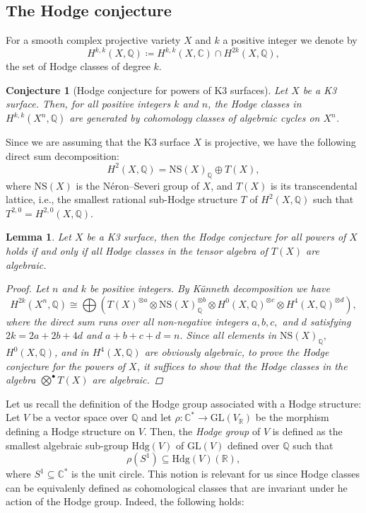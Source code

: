 \documentclass[11pt,twoside,a4paper]{amsart}
\newcommand{\0}{\mathscr{O}}
\newcommand{\R}{\mathbb{R}}
\newcommand{\Q}{\mathbb{Q}}
\newcommand{\C}{\mathbb{C}}
\theoremstyle{plain}
\newtheorem{lem}[thm]{Lemma}
\newtheorem{conj}[thm]{Conjecture}
\theoremstyle{definition}
\theoremstyle{remark}
\begin{document}
\subsection{The Hodge conjecture}
For a smooth complex projective variety $X$ and $k$ a positive integer we denote by 
\[
H^{k,k}(X,\Q)\coloneqq H^{k,k}(X,\C)\cap H^{2k}(X,\Q),
\]
the set of Hodge classes of degree $k$.
\begin{conj}[Hodge conjecture for powers of K3 surfaces] Let $X$ be a K3 surface. Then, for all positive integers $k$ and $n$, the Hodge classes in $H^{k,k}(X^n,\Q)$ are generated by cohomology classes of algebraic cycles on $X^n$.
\end{conj}
Since we are assuming that the K3 surface $X$ is projective, we have the following direct sum decomposition:
\[
H^2(X,\Q)=\mathrm{NS}(X)_\Q\oplus T(X),
\]
where $\mathrm{NS}(X)$ is the Néron--Severi group of $X$, and $T(X)$ is its transcendental lattice, i.e., the smallest rational sub-Hodge structure $T$ of $H^2(X,\Q)$ such that $T^{2,0}=H^{2,0}(X,\Q).$
\begin{lem}
\label{Lem.: Hodge conjecture and Transcendental lattice}
Let $X$ be a K3 surface, then the Hodge conjecture for all powers of $X$ holds if and only if all Hodge classes in the tensor algebra of $T(X)$ are algebraic.
\begin{proof}
Let $n$ and $k$ be positive integers. By K\"{u}nneth decomposition we have
\[
H^{2k}(X^n,\Q)\cong\bigoplus \left( T(X)^{\otimes a}\otimes \mathrm{NS}(X)_\Q^{\otimes b}\otimes H^0(X,\Q)^{\otimes c}\otimes H^4(X,\Q)^{\otimes d}\right),
\]
where the direct sum runs over all non-negative integers $a,b,c,$ and $d$ satisfying $2k=2a+2b+4d$ and $a+b+c+d=n$.
Since all elements in $\mathrm{NS}(X)_\Q,$ $H^0(X,\Q)$, and in $H^4(X,\Q)$ are obviously algebraic, to prove the Hodge conjecture for the powers of $X$, it suffices to show that the Hodge classes in the algebra $\bigotimes^{\bullet}T(X)$ are algebraic.
\end{proof}
\end{lem}
Let us recall the definition of the Hodge group associated with a Hodge structure:
Let $V$ be a vector space over $\Q$ and let $\rho\colon \C^*\rightarrow \mathrm{GL}(V_\R)$ be the morphism defining a Hodge structure on $V$. Then, the \textit{Hodge group} of $V$ is defined as the smallest algebraic sub-group $\mathrm{Hdg}(V)$ of $\mathrm{GL}(V)$ defined over $\Q$ such that
\[
\rho(S^1)\subseteq \mathrm{Hdg}(V)(\R),
\]
where $S^1\subseteq \C^*$ is the unit circle.
This notion is relevant for us since Hodge classes can be equivalenly defined as cohomological classes that are invariant under he action of the Hodge group. Indeed, the following holds: 
\end{document}
